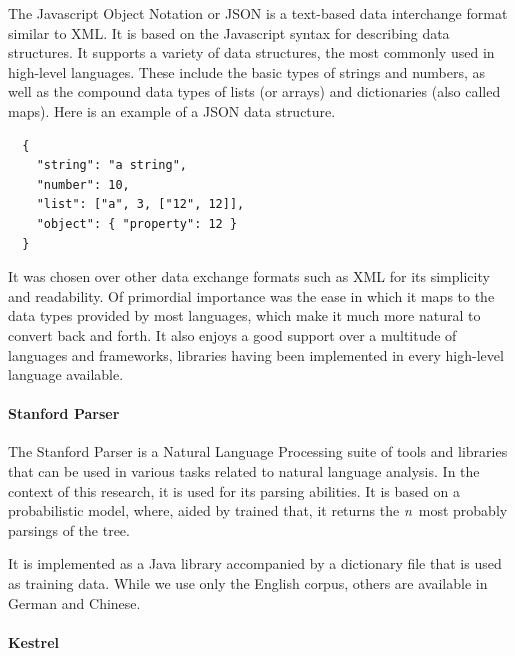The Javascript Object Notation or JSON is a text-based data interchange format similar to XML. It is based on the Javascript syntax for describing data structures. It supports a variety of data structures, the most commonly used in high-level languages. These include the basic types of strings and numbers, as well as the compound data types of lists (or arrays) and dictionaries (also called maps). Here is an example of a JSON data structure.

\begin{verbatim}
  {
    "string": "a string",
    "number": 10,
    "list": ["a", 3, ["12", 12]],
    "object": { "property": 12 }
  }
\end{verbatim}

It was chosen over other data exchange formats such as XML for its simplicity and readability. Of primordial importance was the ease in which it maps to the data types provided by most languages, which make it much more natural to convert back and forth. It also enjoys a good support over a multitude of languages and frameworks, libraries having been implemented in every high-level language available.


\paragraph{Stanford Parser} %
\label{par:stanford_parser}

The Stanford Parser is a Natural Language Processing suite of tools and libraries that can be used in various tasks related to natural language analysis. In the context of this research, it is used for its parsing abilities. It is based on a probabilistic model, where, aided by trained that, it returns the \emph{n}\ most probably parsings of the tree.

It is implemented as a Java library accompanied by a dictionary file that is used as training data. While we use only the English corpus, others are available in German and Chinese.


\paragraph{Kestrel} %
\label{par:kestrel}

